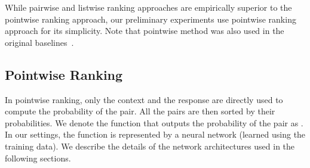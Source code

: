 \documentclass{article} \usepackage{nips15submit_e,times}
\begin{document}
While pairwise and listwise ranking approaches are empirically superior to the pointwise ranking approach, our preliminary experiments use pointwise ranking approach for its simplicity. Note that pointwise method was also used in the original baselines~\cite{lowe2015ubuntu}.

\subsection{Pointwise Ranking}

In pointwise ranking, only the context and the response are directly used to compute the probability of the pair. All the pairs are then sorted by their probabilities. 
We denote the function that outputs the probability of the pair as .
In our settings, the function  is represented by a neural network (learned using the training data).
We describe the details of the network architectures used in the following sections.
\end{document}
